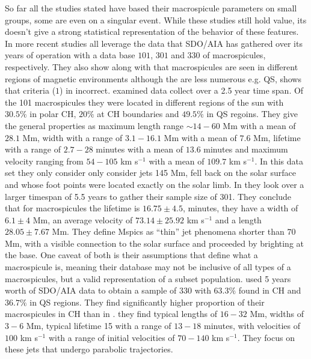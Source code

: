 \documentclass[12pt]{ociamthesis}
\begin{document}
\par So far all the studies stated have based their macrospicule parameters on small groups, some are even on a singular event. While these studies still hold value, its doesn't give a strong statistical representation of the behavior of these features. In more recent studies \cite{Bennett2015ApJ808135B,Kiss2017ApJ83547K,Loboda2019ApJ871230L} all leverage the data that SDO/AIA has gathered over its years of operation with a data base $101$, 
$301$ and $330$ of macrospicules, respectively. They also show along with \cite{Wang1998ApJ509461W} that macrospicules are seen in different regions of magnetic environments although the are less numerous e.g. QS, shows that criteria ($1$) in incorrect. \cite{Bennett2015ApJ808135B} examined data collect over a 2.5 year time span. Of the 101 macrospicules they were located in different regions of the sun with $30.5\%$ in polar CH, $20\%$ at CH boundaries and $49.5\%$ in QS regoins. They give the general properties as maximum length range $\sim 14-60$ Mm with a mean of $28.1$ Mm, width with a range of $3.1-16.1$ Mm with a mean of $7.6$ Mm, lifetime with a range of $2.7-28$ minutes with a mean of $13.6$ minutes and maximum velocity ranging from $54-105$ km s$^{-1}$ with a mean of $109.7$ km s$^{-1}$. In this data set they only consider only consider jets 145 Mm, fell back on the solar surface and whose foot points were located exactly on the solar limb. In \cite{Kiss2017ApJ83547K} they look over a larger timespan of 5.5 years to gather their sample size of 301. They conclude that for macrospicules the lifetime is $16.75\pm4.5$, minutes, they have a width of $6.1\pm4$ Mm, an average velocity of $73.14\pm25.92$ km s$^{-1}$ and a length $28.05\pm7.67$ Mm. They define Mspics as ``thin'' jet phenomena shorter than $70$ Mm, with a visible connection to the solar surface and proceeded by brighting at the base. One caveat of both \cite{Kiss2017ApJ83547K,Bennett2015ApJ808135B} is their assumptions that define what a macrospicule is, meaning their database may not be inclusive of all types of a macrospicules, but a valid representation of a subset population. \cite{Loboda2019ApJ871230L} used 5 years worth of SDO/AIA data to obtain a sample of 330 with $63.3\%$ found in CH and $36.7\%$ in QS regions. They find significantly higher proportion of their macrospicules in CH than in \cite{Bennett2015ApJ808135B}. they find typical lengths of $16-32$ Mm, widths of $3-6$ Mm, typical lifetime 15 with a range of $13-18$ minutes, with velocities of $100$ km s$^{-1}$ with a range of initial velocities of $70-140$ km s$^{-1}$. They focus on these jets that undergo parabolic trajectories. \\ \\
\end{document}

